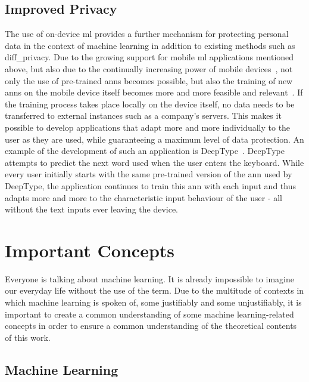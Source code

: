 \documentclass[
			   fontsize=11pt,
               paper=a4,
               bibliography=totoc,
               idxtotoc,
               headsepline,
               footsepline,
               footinclude=false,
               BCOR=12mm,
               DIV=13,
               openany,   %
               ]
               {scrbook}
\begin{document}
\section{Improved Privacy} \label{sec:privacy}

The use of on-device \gls{ml} provides a further mechanism for protecting personal data in the context of machine learning in addition to existing methods such as \gls{diff_privacy}. Due to the growing support for mobile \gls{ml} applications mentioned above, but also due to the continually increasing power of mobile devices~\cite{mobile_cpu_power}, not only the use of pre-trained \glspl{ann} becomes possible, but also the training of new \glspl{ann} on the mobile device itself becomes more and more feasible and relevant~\cite{liu19}. If the training process takes place locally on the device itself, no data needs to be transferred to external instances such as a company's servers. This makes it possible to develop applications that adapt more and more individually to the user as they are used, while guaranteeing a maximum level of data protection. An example of the development of such an application is DeepType~\cite{deepType}. DeepType attempts to predict the next word used when the user enters the keyboard. While every user initially starts with the same pre-trained version of the \gls{ann} used by DeepType, the application continues to train this \gls{ann} with each input and thus adapts more and more to the characteristic input behaviour of the user - all without the text inputs ever leaving the device.


\chapter{Important Concepts}

Everyone is talking about machine learning. It is already impossible to imagine our everyday life without the use of the term. Due to the multitude of contexts in which machine learning is spoken of, some justifiably and some unjustifiably, it is important to create a common understanding of some machine learning-related concepts in order to ensure a common understanding of the theoretical contents of this work.


\section{Machine Learning}
\end{document}
